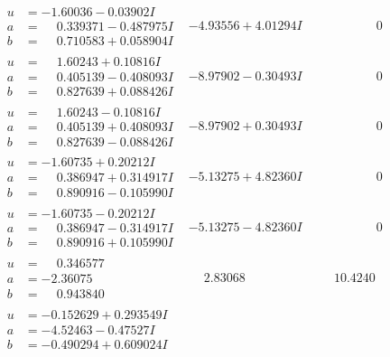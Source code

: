 \documentclass[1p]{elsarticle_modified}
\theoremstyle{definition}
\begin{document}
$$\begin{array}{c|c|c}
\begin{aligned}
u &= -1.60036 - 0.03902 I \\
a &= \phantom{-}0.339371 - 0.487975 I \\
b &= \phantom{-}0.710583 + 0.058904 I\end{aligned}
 & -4.93556 + 4.01294 I & \phantom{-0.000000 } 0 \\ \hline\begin{aligned}
u &= \phantom{-}1.60243 + 0.10816 I \\
a &= \phantom{-}0.405139 - 0.408093 I \\
b &= \phantom{-}0.827639 + 0.088426 I\end{aligned}
 & -8.97902 - 0.30493 I & \phantom{-0.000000 } 0 \\ \hline\begin{aligned}
u &= \phantom{-}1.60243 - 0.10816 I \\
a &= \phantom{-}0.405139 + 0.408093 I \\
b &= \phantom{-}0.827639 - 0.088426 I\end{aligned}
 & -8.97902 + 0.30493 I & \phantom{-0.000000 } 0 \\ \hline\begin{aligned}
u &= -1.60735 + 0.20212 I \\
a &= \phantom{-}0.386947 + 0.314917 I \\
b &= \phantom{-}0.890916 - 0.105990 I\end{aligned}
 & -5.13275 + 4.82360 I & \phantom{-0.000000 } 0 \\ \hline\begin{aligned}
u &= -1.60735 - 0.20212 I \\
a &= \phantom{-}0.386947 - 0.314917 I \\
b &= \phantom{-}0.890916 + 0.105990 I\end{aligned}
 & -5.13275 - 4.82360 I & \phantom{-0.000000 } 0 \\ \hline\begin{aligned}
u &= \phantom{-}0.346577\phantom{ +0.000000I} \\
a &= -2.36075\phantom{ +0.000000I} \\
b &= \phantom{-}0.943840\phantom{ +0.000000I}\end{aligned}
 & \phantom{-}2.83068\phantom{ +0.000000I} & \phantom{-}10.4240\phantom{ +0.000000I} \\ \hline\begin{aligned}
u &= -0.152629 + 0.293549 I \\
a &= -4.52463 - 0.47527 I \\
b &= -0.490294 + 0.609024 I\end{aligned}

\end{array}$$
\end{document}
